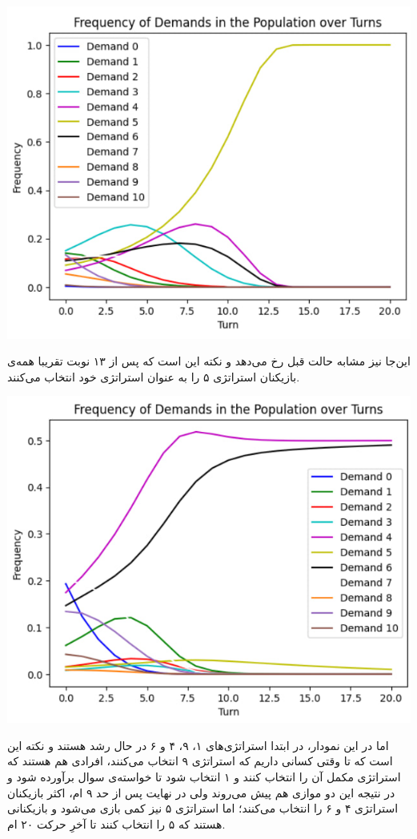 \begin{center}
	\includegraphics{2}
\end{center}

این‌جا نیز مشابه حالت قبل رخ می‌دهد و نکته این است که پس از ۱۳ نوبت تقریبا همه‌ی بازیکنان استراتژی ۵ را به عنوان استراتژی خود انتخاب می‌کنند.

\begin{center}
	\includegraphics{3}
\end{center}

اما در این نمودار، در ابتدا استراتژی‌های ۱، ۹، ۴ و ۶ در حال رشد هستند و نکته این است که تا وقتی کسانی داریم که استراتژی ۹ انتخاب می‌کنند، افرادی هم هستند که استراتژی مکمل آن را انتخاب کنند و ۱ انتخاب شود تا خواسته‌ی سوال برآورده شود و در نتیجه این دو موازی هم پیش می‌روند ولی در نهایت پس از حد ۹ ام، اکثر بازیکنان استراتژی ۴ و ۶ را انتخاب می‌کنند؛ اما استراتژی ۵ نیز کمی بازی می‌شود و بازیکنانی هستند که ۵ را انتخاب کنند تا آخرِ حرکت ۲۰ ام.

